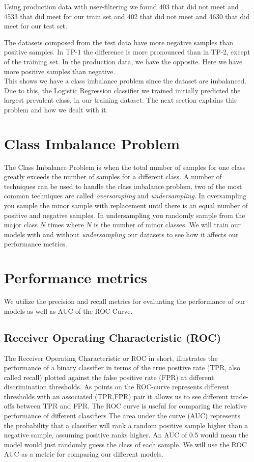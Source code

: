 Using production data with user-filtering we found 403 that did not meet and 4533 that did meet for our train set and 402 that did not meet and 4630 that did meet for our test set.

The datasets composed from the test data have more negative samples than positive samples. In TP-1 the difference is more pronounced than in TP-2, except of the training set. In the production data, we have the opposite. Here we have more positive samples than negative. \\
This shows we have a class imbalance problem since the dataset are imbalanced. Due to this, the Logistic Regression classifier we trained initially predicted the largest prevalent class, in our training dataset. The next section explains this problem and how we dealt with it. 


\section{Class Imbalance Problem}
\label{sec:class_imbalance_problem}
The Class Imbalance Problem is when the total number of samples for one class greatly exceeds the number of samples for a different class. A number of techniques can be used to handle the class imbalance problem, two of the most common techniques are called \textit{oversampling} and \textit{undersampling}\cite{tan2006introduction}. In oversampling you sample the minor sample with replacement until there is an equal number of positive and negative samples. In undersampling you randomly sample from the major class $N$ times where $N$ is the number of minor classes. We will train our models with and without \textit{undersampling} our datasets to see how it affects our performance metrics.

\section{Performance metrics}
\label{sec:performance_metrics}
We utilize the precision and recall metrics for evaluating the performance of our models as well as AUC of the ROC Curve.

\subsection{Receiver Operating Characteristic (ROC)}
The Receiver Operating Characteristic or ROC in short, illustrates the performance of a binary classifier in terms of the true positive rate (TPR, also called recall) plotted against the false positive rate (FPR) at different discrimination thresholds. As points on the ROC-curve represents different thresholds with an associated (TPR,FPR) pair it allows us to see different trade-offs between TPR and FPR. The ROC curve is useful for comparing the relative performance of different classifiers\cite{tan2006introduction} The area under the curve (AUC) represents the probability that a classifier will rank a random positive sample higher than a negative sample, assuming positive ranks higher. An AUC of 0.5 would mean the model would just randomly guess the class of each sample. We will use the ROC AUC as a metric for comparing our different models.

